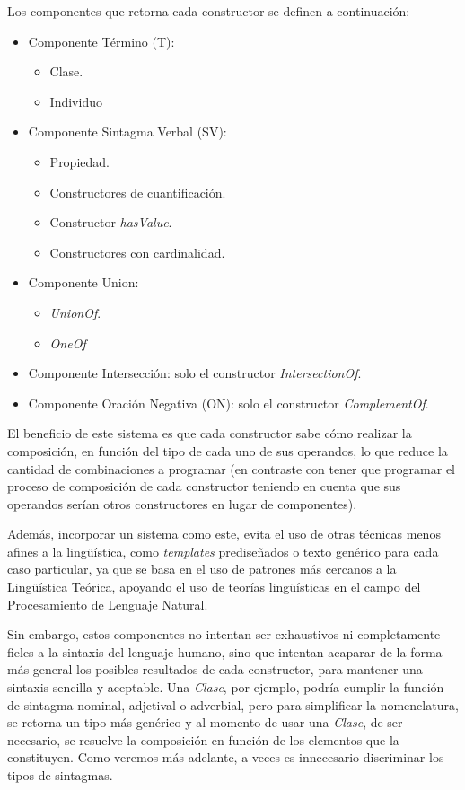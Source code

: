 Los componentes que retorna cada constructor se definen a continuación:
\begin{itemize}
    \item Componente Término (T):
    \begin{itemize}
        \item Clase.
        \item Individuo
    \end{itemize}
    \item Componente Sintagma Verbal (SV):
    \begin{itemize}
        \item Propiedad.
        \item Constructores de cuantificación.
        \item Constructor \emph{hasValue}.
        \item Constructores con cardinalidad.
    \end{itemize}
    \item Componente Union: 
    \begin{itemize}
        \item \emph{UnionOf}.
        \item \emph{OneOf}
    \end{itemize}
    
    \item Componente Intersección: solo el constructor \emph{IntersectionOf}.
    \item Componente Oración Negativa (ON): solo el constructor \emph{ComplementOf}.
\end{itemize}

El beneficio de este sistema es que cada constructor sabe cómo realizar la composición, en función del tipo de cada uno de sus operandos, lo que reduce la cantidad de combinaciones a programar (en contraste con tener que programar el proceso de composición de cada constructor teniendo en cuenta que sus operandos serían otros constructores en lugar de componentes). 

Además, incorporar un sistema como este, evita el uso de otras técnicas menos afines a la lingüística, como \emph{templates} prediseñados o texto genérico para cada caso particular, ya que se basa en el uso de patrones más cercanos a la Lingüística Teórica, apoyando el uso de teorías lingüísticas en el campo del Procesamiento de Lenguaje Natural.


Sin embargo, estos componentes no intentan ser exhaustivos ni completamente fieles a la sintaxis del lenguaje humano, sino que intentan acaparar de la forma más general los posibles resultados de cada constructor, para mantener una sintaxis sencilla y aceptable. Una \textit{Clase}, por ejemplo, podría cumplir la función de sintagma nominal, adjetival o adverbial, pero para simplificar la nomenclatura, se retorna un tipo más genérico y al momento de usar una \textit{Clase}, de ser necesario, se resuelve la composición en función de los elementos que la constituyen. Como veremos más adelante, a veces es innecesario discriminar los tipos de sintagmas.


